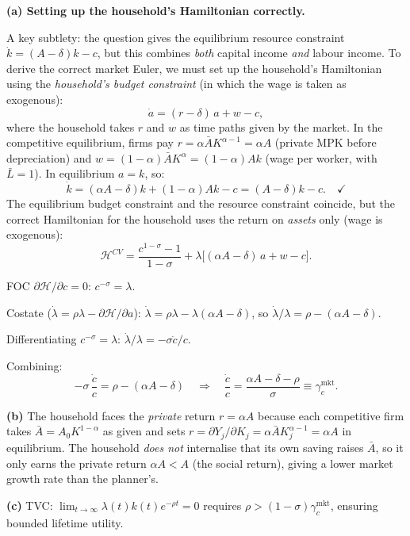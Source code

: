 \documentclass[a4paper,11pt]{article}
\begin{document}
\begin{answerbox}
\textbf{(a) Setting up the household's Hamiltonian correctly.}

A key subtlety: the question gives the equilibrium resource constraint
$\dot{k} = (A-\delta)k - c$, but this combines \emph{both} capital income
\emph{and} labour income.  To derive the correct market Euler, we must set up the
household's Hamiltonian using the \emph{household's budget constraint} (in which
the wage is taken as exogenous):
\[
    \dot{a} = (r - \delta)\,a + w - c,
\]
where the household takes $r$ and $w$ as time paths given by the market.  In the
competitive equilibrium, firms pay $r = \alpha \bar{A} K^{\alpha-1} = \alpha A$ (private
MPK before depreciation) and $w = (1-\alpha)\bar{A}K^{\alpha} = (1-\alpha)Ak$ (wage per
worker, with $\bar{L}=1$).  In equilibrium $a = k$, so:
\[
    \dot{k} = (\alpha A - \delta)k + (1-\alpha)Ak - c = (A-\delta)k - c. \quad\checkmark
\]
The equilibrium budget constraint and the resource constraint coincide, but the correct
Hamiltonian for the household uses the return on \emph{assets} only (wage is exogenous):
\[
    \mathcal{H}^{CV} = \frac{c^{1-\sigma}-1}{1-\sigma}
    + \lambda\bigl[(\alpha A - \delta)\,a + w - c\bigr].
\]

FOC $\partial\mathcal{H}/\partial c = 0$: $c^{-\sigma} = \lambda$.

Costate ($\dot{\lambda} = \rho\lambda - \partial\mathcal{H}/\partial a$):
$\dot{\lambda} = \rho\lambda - \lambda(\alpha A - \delta)$, so
$\dot{\lambda}/\lambda = \rho - (\alpha A - \delta)$.

Differentiating $c^{-\sigma} = \lambda$: $\dot{\lambda}/\lambda = -\sigma\dot{c}/c$.

Combining:
\[
    -\sigma\,\frac{\dot{c}}{c} = \rho - (\alpha A - \delta)
    \quad\Longrightarrow\quad
    \boxed{\frac{\dot{c}}{c} = \frac{\alpha A - \delta - \rho}{\sigma}
    \equiv \gamma_c^{\mathrm{mkt}}.}
\]

\textbf{(b)} The household faces the \emph{private} return $r = \alpha A$ because each
competitive firm takes $\bar{A} = A_0 K^{1-\alpha}$ as given and sets
$r = \partial Y_j/\partial K_j = \alpha\bar{A}K_j^{\alpha-1} = \alpha A$ in equilibrium.
The household \emph{does not} internalise that its own saving raises $\bar{A}$, so it
only earns the private return $\alpha A < A$ (the social return), giving a lower market
growth rate than the planner's.

\textbf{(c)} TVC: $\lim_{t\to\infty} \lambda(t)k(t)e^{-\rho t} = 0$ requires
$\rho > (1-\sigma)\gamma_c^{\mathrm{mkt}}$, ensuring bounded lifetime utility.
\end{answerbox}
\end{document}

